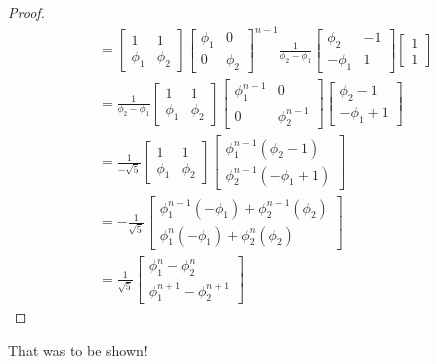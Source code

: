 \documentclass[paper=a4, fontsize=11pt,twoside]{scrartcl}		%
\theoremstyle{definition}
\theoremstyle{remark}
\begin{document}
\begin{proof}
\begin{align*}
&=\left[ \begin{matrix} 1& 1 \\ \phi_1 &\phi_2\end{matrix}\right]\left[ \begin{matrix} \phi_1& 0 \\0  &\phi_2\end{matrix}\right]^{n-1}\frac{1}{\phi_2 -\phi_1}\left[ \begin{matrix} \phi_2 & -1 \\ -\phi_1 &1\end{matrix}\right]\left[\begin{matrix} 1\\ 1 \end{matrix}\right]\\
&=\frac{1}{\phi_2 -\phi_1}\left[ \begin{matrix} 1& 1 \\ \phi_1 &\phi_2\end{matrix}\right]\left[ \begin{matrix} \phi_1^{n-1}& 0 \\0  &\phi_2^{n-1}\end{matrix}\right]\left[ \begin{matrix} \phi_2 -1 \\ -\phi_1 +1\end{matrix}\right]\\
&=\frac{1}{-\sqrt{5}}\left[ \begin{matrix} 1& 1 \\ \phi_1 &\phi_2\end{matrix}\right]\left[ \begin{matrix} \phi_1^{n-1}(\phi_2 -1 )\\ \phi_2^{n-1}(-\phi_1+1)\end{matrix}\right]\\
&=-\frac{1}{\sqrt{5}}\left[ \begin{matrix} \phi_1^{n-1}(-\phi_1)+\phi_2^{n-1}(\phi_2)\\ \phi_1^{n}(-\phi_1) + \phi_2^{n}(\phi_2)\end{matrix}\right]\\
&=\frac{1}{\sqrt{5}}\left[ \begin{matrix} \phi_1^{n}-\phi_2^{n}\\ \phi_1^{n+1}-\phi_2^{n+1}\end{matrix}\right]
\end{align*}
\end{proof}
That was to be shown!
\end{document}
